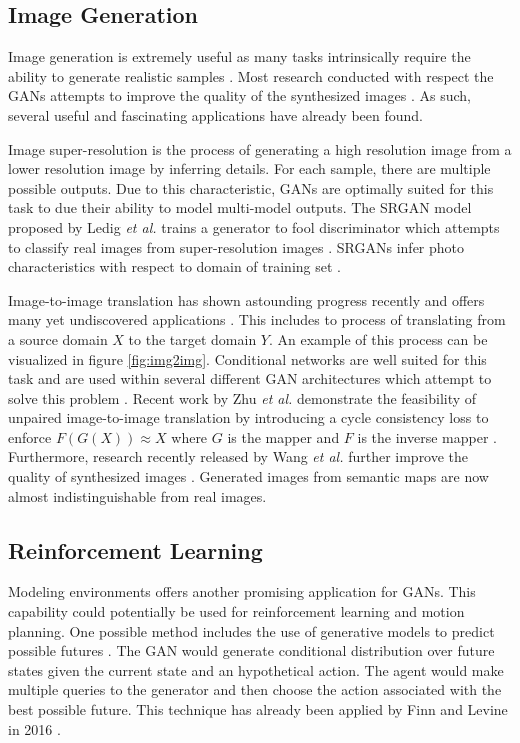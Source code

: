 \documentclass[11pt]{article}
\begin{document}
\subsection{Image Generation} \label{sec:img2img}
Image generation is extremely useful as many tasks intrinsically require the ability to generate realistic samples \citep{2017arXiv170100160G}. Most research conducted with respect the GANs attempts to improve the quality of the synthesized images \citep{2017arXiv171007035C}. As such, several useful and fascinating applications have already been found.

Image super-resolution is the process of generating a high resolution image from a lower resolution image by inferring details. For each sample, there are multiple possible outputs. Due to this characteristic, GANs are optimally suited for this task to due their ability to model multi-model outputs. The SRGAN model proposed by Ledig \textit{et al.} trains a generator to fool discriminator which attempts to classify real images from super-resolution images \citep{2016arXiv160904802L}. SRGANs infer photo characteristics with respect to domain of training set \citep{2017arXiv171007035C}.

Image-to-image translation has shown astounding progress recently and offers many yet undiscovered applications \citep{2017arXiv170100160G}. This includes to process of translating from a source domain $X$ to the target domain $Y$. An example of this process can be visualized in figure \ref{fig:img2img}. Conditional networks are well suited for this task and are used within several different GAN architectures which attempt to solve this problem \citep{2016arXiv161107004I, 2017arXiv171111585W, 2017arXiv170310593Z}. Recent work by Zhu \textit{et al.} demonstrate the feasibility of unpaired image-to-image translation by introducing a cycle consistency loss to enforce $F(G(X)) ≈ X$ where $G$ is the mapper and $F$ is the inverse mapper \citep{2017arXiv170310593Z}. Furthermore, research recently released by Wang \textit{et al.} further improve the quality of synthesized images \citep{2017arXiv171111585W}. Generated images from semantic maps are now almost indistinguishable from real images.

\subsection{Reinforcement Learning}
Modeling environments offers another promising application for GANs. This capability could potentially be used for reinforcement learning and motion planning. One possible method includes the use of generative models to predict possible futures \citep{2017arXiv170100160G}. The GAN would generate conditional distribution over future states given the current state and an hypothetical action. The agent would make multiple queries to the generator and then choose the action associated with the best possible future. This technique has already been applied by Finn and Levine in 2016 \citep{2016arXiv161000696F}.
\end{document}
